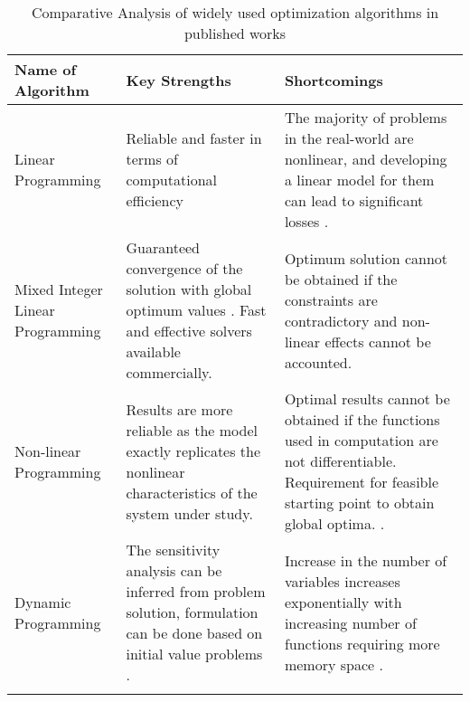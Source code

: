 \begin{enumerate}



\begin{table*}[htbp]
\renewcommand\arraystretch{1.3}
\centering
\caption{Comparative Analysis of widely used optimization algorithms in  published works \cite{allwyn2023comprehensive, chopra2022golden}}
\begin{tabularx}{\textwidth}{ m{3.75cm}  m{6cm}   m{7cm}  }
\Xhline{2\arrayrulewidth} %
\textbf{Name of Algorithm} & \textbf{Key Strengths} & \textbf{Shortcomings} \\ \hline
Linear Programming & 
Reliable and faster in terms of computational efficiency  & 
The majority of problems in the real-world are nonlinear, and developing a linear model for them can lead to significant losses \cite{geem2001new}. \\ \hline

Mixed Integer Linear Programming & 
Guaranteed convergence of the solution with global optimum values \cite{urbanucci2018limits}. Fast and effective solvers available commercially. & 
Optimum solution cannot be obtained if the constraints are contradictory \cite{urbanucci2018limits} and non-linear effects cannot be accounted. \\ \hline

Non-linear Programming & 
Results are more reliable as the model exactly replicates the nonlinear characteristics of the system under study. & 
Optimal results cannot be obtained if the functions used in computation are not differentiable. Requirement for feasible starting point to obtain global optima. \cite{geem2001new}. \\ \hline

Dynamic Programming & 
The sensitivity analysis can be inferred from problem solution\cite{nelson1968dynamic}, formulation can be done based on initial value problems \cite{bellman1965dynamic}. & 
Increase in the number of variables increases exponentially with increasing number of functions requiring more memory space \cite{geem2001new}. \\ 

\Xhline{2\arrayrulewidth} %

\end{tabularx}
\label{table:optimization_algorithms}
\end{table*}









\end{enumerate}
